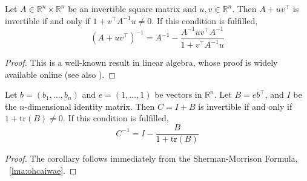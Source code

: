 \documentclass[12pt]{article}
\begin{document}
\begin{lemma}
  \label{lma:ohcaiwae}
  Let $A\in\mathbb{R}^{n}\times\mathbb{R}^{n}$ be an invertible square
  matrix and $u,v\in\mathbb{R}^{n}$. Then $A+uv^{\intercal}$ is
  invertible if and only if $1+v^{\intercal}A^{-1}u\neq{}0$. If this
  condition is fulfilled,
\begin{equation}
  \label{eq:opievuek}
  (A+uv^{\intercal})^{-1}=A^{-1}-\frac{A^{-1}uv^{\intercal}A^{-1}}{1+v^{\intercal}A^{-1}u}
\end{equation}
\end{lemma}
\begin{proof}
  \label{prf:neexukii}
  This is a well-known result in linear algebra, whose proof is widely
  available online (see also ).
\end{proof}

\begin{corollary}
  \label{cor:mieghuen}
  Let $b=(b_{1},{\ldots},b_{n})$ and $e=(1,{\ldots},1)$ be vectors in
  $\mathbb{R}^{n}$. Let $B=eb^{\intercal}$, and $I$ be the
  $n$-dimensional identity matrix. Then $C=I+B$ is invertible if and
  only if $1+\mbox{tr}(B)\neq{}0$. If this condition is fulfilled,
\begin{equation}
  \label{eq:epusoosh}
  C^{-1}=I-\frac{B}{1+\mbox{tr}(B)}
\end{equation}
\end{corollary}
\begin{proof}
  \label{prf:eingethe}
  The corollary follows immediately from the Sherman-Morrison Formula,
  {\emma}~\ref{lma:ohcaiwae}.
\end{proof}
\end{document}
